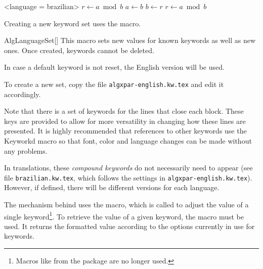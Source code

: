 \documentclass[a4paper, 11pt]{article}
\begin{document}
\begingroup
\begin{tcblisting}{}
    \begin{algorithmic}<language = brazilian>
            \State $r\gets a\bmod b$
                \State $a\gets b$
                \State $b\gets r$
                \State $r\gets a\bmod b$
            \EndWhile
        \EndProcedure
    \end{algorithmic}
\end{tcblisting}
\endgroup


Creating a new keyword set uses the  macro.

\begin{macro}{AlgLanguageSet}[]
    This macro sets new values for known keywords as well as new ones. Once created, keywords cannot be deleted.

    In case a default keyword is not reset, the English version will be used.

    To create a new set, copy the file \texttt{algxpar-english.kw.tex} and edit it accordingly.

    Note that there is a set of keywords for the lines that close each block. These keys are provided to allow for more versatility in changing how these lines are presented. It is highly recommended that references to other keywords use the {Keyworkd} macro so that font, color and language changes can be made without any problems.

    In translations, these \textit{compound keywords} do not necessarily need to appear (see file \texttt{brazilian.kw.tex}, which follows the settings in \texttt{algxpar-english.kw.tex}). However, if defined, there will be different versions for each language.
\end{macro}

\begin{figure}
\end{figure}

The mechanism behind  uses the  macro, which is called to adjust the value of a single keyword\footnote{Macros like  from the  package are no longer used.}. To retrieve the value of a given keyword, the  macro must be used. It returns the formatted value according to the options currently in use for keywords.
\end{document}

